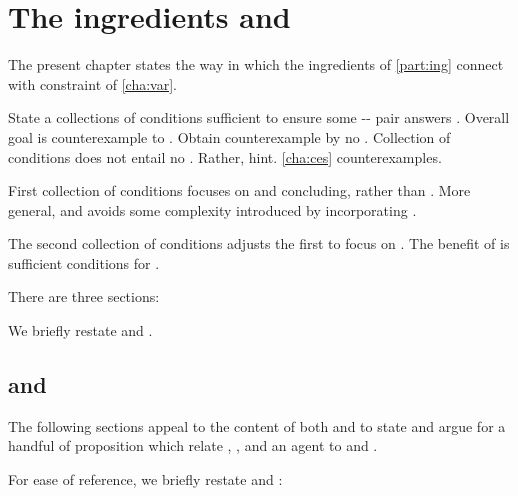 \chapter{The ingredients and \issueConstraint{}}
\label{cha:binding}

\begin{note}
  The present chapter states the way in which the ingredients of \autoref{part:ing} connect with constraint \issueConstraint{} of \autoref{cha:var}.

  State a collections of conditions sufficient to ensure some -- pair answers \qWhyV{}.
  Overall goal is counterexample to \issueConstraint{}.
  Obtain counterexample by no \wit{}.
  Collection of conditions does not entail no \wit{}.
  Rather, hint.
  \autoref{cha:ces} counterexamples.

  First collection of conditions focuses on \requ{} and concluding, rather than \tCV{}.
  More general, and avoids some complexity introduced by incorporating \tCV{}.

  The second collection of conditions adjusts the first to focus on \tCV{}.
  The benefit of \tCV{} is sufficient conditions for \requ{}.
\end{note}

\begin{note}
  There are three sections:
  \begin{TOCEnum}
  \item

    We briefly restate \qWhyV{} and \issueConstraint{}.
  \item
  \item
  \end{TOCEnum}
\end{note}

\section{\qWhyV{} and \issueConstraint{}}
\label{sec:recollection}

\begin{note}
  The following sections appeal to the content of both \qWhyV{} and \issueConstraint{} to state and argue for a handful of proposition which relate , , and an agent \tCV{} to \qWhyV{} and \issueConstraint{}.

  For ease of reference, we briefly restate \qWhyV{} and \issueConstraint{}:


\end{note}


